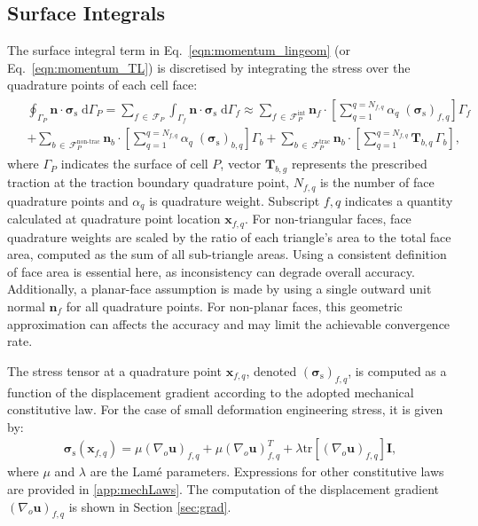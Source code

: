 \documentclass[review,3p]{elsarticle}
\newcommand{\bb}{\boldsymbol}
\begin{document}
\subsection{Surface Integrals}
\label{sec:surf_int}
%
The surface integral term in Eq.~\eqref{eqn:momentum_lingeom} (or Eq.~\eqref{eqn:momentum_TL}) is discretised by integrating the stress over the quadrature points of each cell face:
%
\begin{eqnarray}\label{eq:divStressDiscret}
	\begin{split}
		&\oint_{\Gamma_P} \bb{n} \cdot \bb{\sigma}_\text{s} \; \text{d}\Gamma_P
		=
		\sum_{f \, \in \,\mathcal{F}_P} \int_{\Gamma_f} \bb{n} \cdot \bb{\sigma}_\text{s} \; \text{d}\Gamma_f
		\approx
		\sum_{f \,\in\, \mathcal{F}_P^{\text{int}}} \bb{n}_{f} \cdot \left [ \sum_{q=1}^{q=N_{f,q}}\alpha_q \; (\bb{\sigma}_\text{s})_{f,q} \right]\Gamma_f \\
		& + \sum_{b\, \in \,\mathcal{F}_P^{\text{non-trac}}}  \bb{n}_{b} \cdot \left [ \sum_{q=1}^{q=N_{f,q}}\alpha_q \; (\bb{\sigma}_\text{s})_{b,q} \right]\Gamma_b
		+ \sum_{b\, \in \, \mathcal{F}_P^{\text{trac}}}   \bb{n}_{b} \cdot \left[ \sum_{q=1}^{q=N_{f,q}}\bb{T}_{b,q} \,\Gamma_b\right],
	\end{split}
\end{eqnarray}
%
where $\Gamma_P$ indicates the surface of cell $P$,
vector $\bb{T}_{b,g}$ represents the prescribed traction at the traction boundary quadrature point,
$N_{f,q}$ is the number of face quadrature points and
$\alpha_q$ is quadrature weight. Subscript ${f,q}$ indicates a quantity calculated at quadrature point location $\bb{x}_{f,q}$.
For non-triangular faces, face quadrature weights are scaled by the ratio of each triangle’s area to the total face area,
computed as the sum of all sub-triangle areas. Using a consistent definition of face area is essential here,
as inconsistency can degrade overall accuracy.
Additionally, a planar-face assumption is made by using a single outward unit normal \(\bb{n}_f\) for all quadrature points.
For non-planar faces, this geometric approximation can affects the accuracy and may limit the achievable convergence rate.

The stress tensor at a quadrature point $\bb{x}_{f,q}$, denoted $(\bb{\sigma}_\text{s})_{f,q}$, is computed as a function of the displacement gradient according to the adopted mechanical constitutive law.
For the case of small deformation engineering stress, it is given by:
\begin{eqnarray}
	\bb{\sigma}_\text{s}(\bb{x}_{f,q}) =   \mu (\nabla_o \bb{u})_{f,q} + \mu (\nabla_o \bb{u})^T_{f,q} +\lambda \text{tr}\left[(\nabla_o \bb{u})_{f,q} \right]\bb{I},
\end{eqnarray}
where $\mu$ and $\lambda$ are the Lamé parameters.
Expressions for other constitutive laws are provided in \ref{app:mechLaws}.
The computation of the displacement gradient $(\nabla_o \bb{u})_{f,q}$ is shown in Section \ref{sec:grad}.
%
\end{document}
